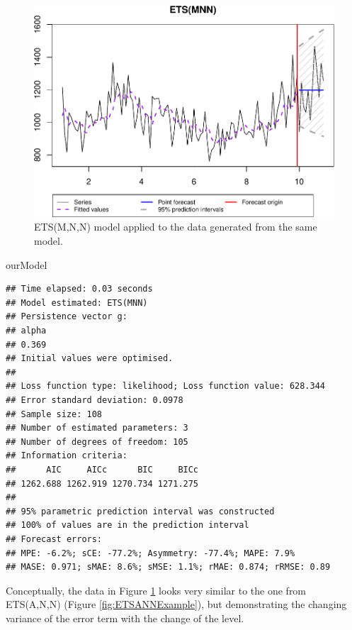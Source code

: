 \documentclass[
]{book}
\newenvironment{Shaded}{\begin{snugshade}}{\end{snugshade}}
\newcommand{\NormalTok}[1]{#1}
\theoremstyle{definition}
\theoremstyle{definition}
\theoremstyle{definition}
\theoremstyle{definition}
\theoremstyle{remark}
\begin{document}
\begin{figure}
\centering
\includegraphics{adam_files/figure-latex/ETSMNNExample-1.pdf}
\caption{\label{fig:ETSMNNExample}ETS(M,N,N) model applied to the data generated from the same model.}
\end{figure}

\begin{Shaded}
\begin{Highlighting}[]
\NormalTok{ourModel}
\end{Highlighting}
\end{Shaded}

\begin{verbatim}
## Time elapsed: 0.03 seconds
## Model estimated: ETS(MNN)
## Persistence vector g:
## alpha 
## 0.369 
## Initial values were optimised.
## 
## Loss function type: likelihood; Loss function value: 628.344
## Error standard deviation: 0.0978
## Sample size: 108
## Number of estimated parameters: 3
## Number of degrees of freedom: 105
## Information criteria:
##      AIC     AICc      BIC     BICc 
## 1262.688 1262.919 1270.734 1271.275 
## 
## 95% parametric prediction interval was constructed
## 100% of values are in the prediction interval
## Forecast errors:
## MPE: -6.2%; sCE: -77.2%; Asymmetry: -77.4%; MAPE: 7.9%
## MASE: 0.971; sMAE: 8.6%; sMSE: 1.1%; rMAE: 0.874; rRMSE: 0.89
\end{verbatim}

Conceptually, the data in Figure \ref{fig:ETSMNNExample} looks very similar to the one from ETS(A,N,N) (Figure \ref{fig:ETSANNExample}), but demonstrating the changing variance of the error term with the change of the level.
\end{document}
